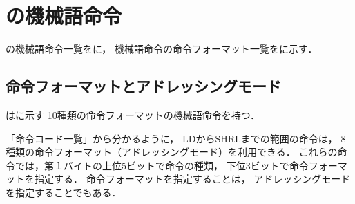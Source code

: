 \chapter{{\tac}の機械語命令}

\newcommand{\twoWord}[7]{
\texttt{\tabcolsep=0cm
  \begin{tabular}{| wc{24mm} | wc{12mm} | wc{12mm} | wc{48mm} |}
    \multicolumn{1}{c}{\footnotesize OP(8)}  &
    \multicolumn{1}{c}{\footnotesize #1(4)}  &
    \multicolumn{1}{c}{\footnotesize #2(4)}  &
    \multicolumn{1}{c}{\footnotesize #3(16)} \\\hline
    #4 & #5 & #6 & #7 \\\hline
  \end{tabular}}
}

\newcommand{\oneWord}[5]{
\texttt{\tabcolsep=0cm
  \begin{tabular}{| wc{24mm} | wc{12mm} | wc{12mm} |}
    \multicolumn{1}{c}{\footnotesize OP(8)}  &
    \multicolumn{1}{c}{\footnotesize #1(4)}  &
    \multicolumn{1}{c}{\footnotesize #2(4)}  \\\hline
    #3 & #4 & #5 \\\hline
  \end{tabular}}
}

\newcommand{\opCode}[3]{
\texttt{\tabcolsep=0cm
  \begin{tabular}{| wc{24mm} | wc{12mm} | wc{12mm} |}
    \hline #1 & #2 & #3 \\\hline
  \end{tabular}}
}

{\tac}の機械語命令一覧をに，
機械語命令の命令フォーマット一覧をに示す．

\section{命令フォーマットとアドレッシングモード}
{\tac}はに示す
10種類の命令フォーマットの機械語命令を持つ．

「命令コード一覧」から分かるように，
LDからSHRLまでの範囲の命令は，
8種類の命令フォーマット（アドレッシングモード）を利用できる．
これらの命令では，第１バイトの上位5ビットで命令の種類，
下位3ビットで命令フォーマットを指定する．
命令フォーマットを指定することは，
アドレッシングモードを指定することでもある．


